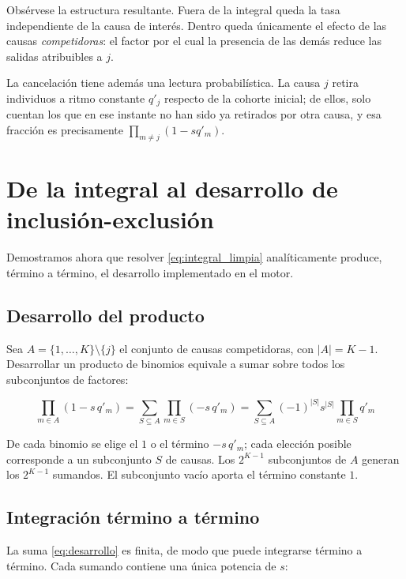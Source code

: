 \documentclass[a4paper, 12pt]{article}
\begin{document}
Obsérvese la estructura resultante. Fuera de la integral queda la tasa independiente de la causa de interés. Dentro queda únicamente el efecto de las causas \emph{competidoras}: el factor por el cual la presencia de las demás reduce las salidas atribuibles a $j$.

La cancelación tiene además una lectura probabilística. La causa $j$ retira individuos a ritmo constante $q'_j$ respecto de la cohorte inicial; de ellos, solo cuentan los que en ese instante no han sido ya retirados por otra causa, y esa fracción es precisamente $\prod_{m\neq j}(1-s q'_m)$.

\newpage

\section{De la integral al desarrollo de inclusión-exclusión}

Demostramos ahora que resolver \eqref{eq:integral_limpia} analíticamente produce, término a término, el desarrollo implementado en el motor.

\subsection{Desarrollo del producto}

Sea $A = \{1,\dots,K\} \setminus \{j\}$ el conjunto de causas competidoras, con $|A| = K-1$. Desarrollar un producto de binomios equivale a sumar sobre todos los subconjuntos de factores:

\begin{equation}
\prod_{m \in A} (1 - s\,q'_m) = \sum_{S \subseteq A} \prod_{m \in S} (-s\,q'_m)
= \sum_{S \subseteq A} (-1)^{|S|} s^{|S|} \prod_{m \in S} q'_m
\label{eq:desarrollo}
\end{equation}

De cada binomio se elige el $1$ o el término $-s\,q'_m$; cada elección posible corresponde a un subconjunto $S$ de causas. Los $2^{K-1}$ subconjuntos de $A$ generan los $2^{K-1}$ sumandos. El subconjunto vacío aporta el término constante $1$.

\subsection{Integración término a término}

La suma \eqref{eq:desarrollo} es finita, de modo que puede integrarse término a término. Cada sumando contiene una única potencia de $s$:
\end{document}
